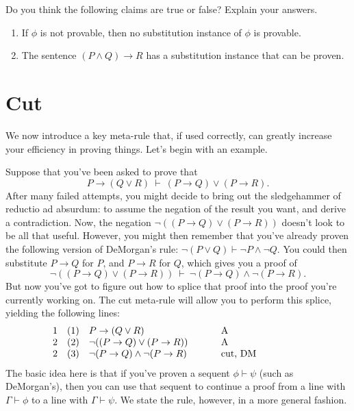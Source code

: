 \begin{exercise} Do you think the following claims are true or false?
  Explain your answers.
  \begin{enumerate}
  \item If $\phi$ is not provable, then no substitution instance of
    $\phi$ is provable.
  \item The sentence $(P\wedge Q)\to R$ has a substitution instance
    that can be proven.
  \end{enumerate} \end{exercise}

\section{Cut}

We now introduce a key meta-rule that, if used correctly, can greatly
increase your efficiency in proving things.  Let's begin with an
example.

Suppose that you've been asked to prove that
\[ P\to (Q\vee R)\:\vdash\: (P\to Q)\vee (P\to R) .\] After many
failed attempts, you might decide to bring out the sledgehammer of
reductio ad absurdum: to assume the negation of the result you want,
and derive a contradiction.  Now, the negation
$\neg ((P\to Q)\vee (P\to R))$ doesn't look to be all that useful.
However, you might then remember that you've already proven the
following version of DeMorgan's rule:
$\neg (P\vee Q)\vdash \neg P\wedge \neg Q$.  You could then substitute
$P\to Q$ for $P$, and $P\to R$ for $Q$, which gives you a proof of
\[ \neg ((P\to Q)\vee (P\to R)) \: \vdash \: \neg (P\to Q)\wedge \neg
  (P\to R) .\] But now you've got to figure out how to splice that
proof into the proof you're currently working on.  The cut meta-rule
will allow you to perform this splice, yielding the following lines:
\[ \begin{array}{l l >{$}p{4.5cm}<{$} p{3cm}}
     1 & (1) & P\to (Q\vee R) & A \\
     2 & (2) & \neg ((P\to Q)\vee (P\to R)) & A \\
     2 & (3) & \neg (P\to Q)\wedge \neg (P\to R) & cut,
                                                   DM \end{array} \]
The basic idea here is that if you've proven a sequent
$\phi\vdash\psi$ (such as DeMorgan's), then you can use that sequent
to continue a proof from a line with $\Gamma\vdash\phi$ to a line with
$\Gamma\vdash\psi$.  We state the rule, however, in a more general fashion.

